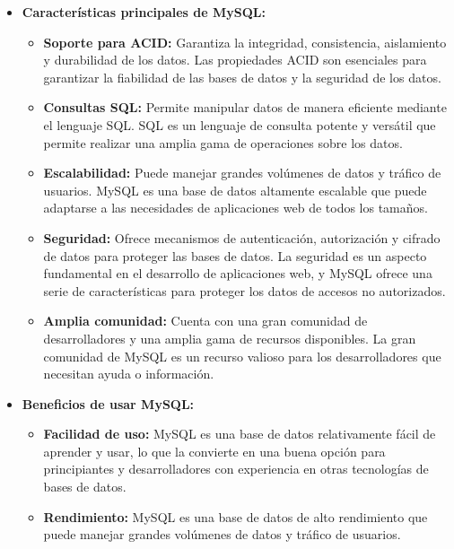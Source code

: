 \begin{itemize}
    \item \textbf{Características principales de MySQL:}

    \begin{itemize}
    
    \item \textbf{Soporte para ACID:} Garantiza la integridad, consistencia, aislamiento y durabilidad de los datos. Las propiedades ACID son esenciales para garantizar la fiabilidad de las bases de datos y la seguridad de los datos.

    \item \textbf{Consultas SQL:} Permite manipular datos de manera eficiente mediante el lenguaje SQL. SQL es un lenguaje de consulta potente y versátil que permite realizar una amplia gama de operaciones sobre los datos.

    \item \textbf{Escalabilidad:} Puede manejar grandes volúmenes de datos y tráfico de usuarios. MySQL es una base de datos altamente escalable que puede adaptarse a las necesidades de aplicaciones web de todos los tamaños.

    \item \textbf{Seguridad:} Ofrece mecanismos de autenticación, autorización y cifrado de datos para proteger las bases de datos. La seguridad es un aspecto fundamental en el desarrollo de aplicaciones web, y MySQL ofrece una serie de características para proteger los datos de accesos no autorizados.
    
    \item \textbf{Amplia comunidad:} Cuenta con una gran comunidad de desarrolladores y una amplia gama de recursos disponibles. La gran comunidad de MySQL es un recurso valioso para los desarrolladores que necesitan ayuda o información.
    \end{itemize}

    \item \textbf{Beneficios de usar MySQL:}

    \begin{itemize}

    \item \textbf{Facilidad de uso:} MySQL es una base de datos relativamente fácil de aprender y usar, lo que la convierte en una buena opción para principiantes y desarrolladores con experiencia en otras tecnologías de bases de datos.
    
    \item \textbf{Rendimiento:} MySQL es una base de datos de alto rendimiento que puede manejar grandes volúmenes de datos y tráfico de usuarios.
    

\end{itemize}
\end{itemize}
